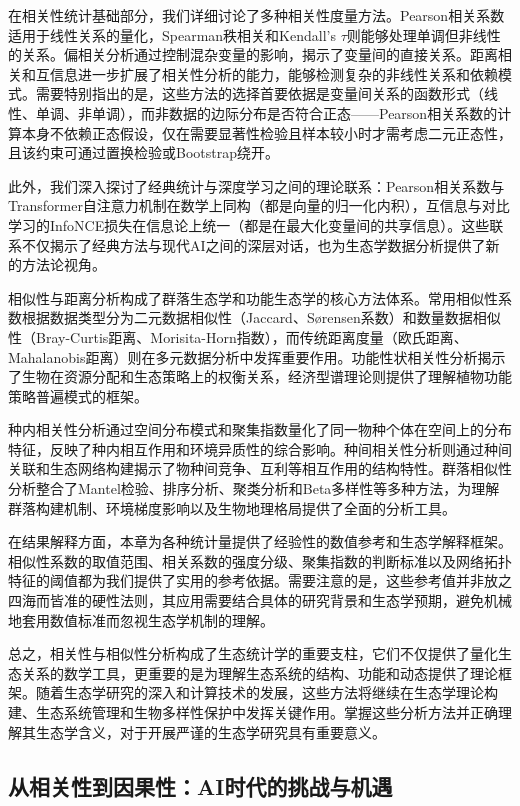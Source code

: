 \documentclass[
  twoside,12pt,fontset=none]{ctexbook}
\begin{document}
在相关性统计基础部分，我们详细讨论了多种相关性度量方法。Pearson相关系数适用于线性关系的量化，Spearman秩相关和Kendall's \(\tau\)则能够处理单调但非线性的关系。偏相关分析通过控制混杂变量的影响，揭示了变量间的直接关系。距离相关和互信息进一步扩展了相关性分析的能力，能够检测复杂的非线性关系和依赖模式。需要特别指出的是，这些方法的选择首要依据是变量间关系的函数形式（线性、单调、非单调），而非数据的边际分布是否符合正态------Pearson相关系数的计算本身不依赖正态假设，仅在需要显著性检验且样本较小时才需考虑二元正态性，且该约束可通过置换检验或Bootstrap绕开。

此外，我们深入探讨了经典统计与深度学习之间的理论联系：Pearson相关系数与Transformer自注意力机制在数学上同构（都是向量的归一化内积），互信息与对比学习的InfoNCE损失在信息论上统一（都是在最大化变量间的共享信息）。这些联系不仅揭示了经典方法与现代AI之间的深层对话，也为生态学数据分析提供了新的方法论视角。

相似性与距离分析构成了群落生态学和功能生态学的核心方法体系。常用相似性系数根据数据类型分为二元数据相似性（Jaccard、Sørensen系数）和数量数据相似性（Bray-Curtis距离、Morisita-Horn指数），而传统距离度量（欧氏距离、Mahalanobis距离）则在多元数据分析中发挥重要作用。功能性状相关性分析揭示了生物在资源分配和生态策略上的权衡关系，经济型谱理论则提供了理解植物功能策略普遍模式的框架。

种内相关性分析通过空间分布模式和聚集指数量化了同一物种个体在空间上的分布特征，反映了种内相互作用和环境异质性的综合影响。种间相关性分析则通过种间关联和生态网络构建揭示了物种间竞争、互利等相互作用的结构特性。群落相似性分析整合了Mantel检验、排序分析、聚类分析和Beta多样性等多种方法，为理解群落构建机制、环境梯度影响以及生物地理格局提供了全面的分析工具。

在结果解释方面，本章为各种统计量提供了经验性的数值参考和生态学解释框架。相似性系数的取值范围、相关系数的强度分级、聚集指数的判断标准以及网络拓扑特征的阈值都为我们提供了实用的参考依据。需要注意的是，这些参考值并非放之四海而皆准的硬性法则，其应用需要结合具体的研究背景和生态学预期，避免机械地套用数值标准而忽视生态学机制的理解。

总之，相关性与相似性分析构成了生态统计学的重要支柱，它们不仅提供了量化生态关系的数学工具，更重要的是为理解生态系统的结构、功能和动态提供了理论框架。随着生态学研究的深入和计算技术的发展，这些方法将继续在生态学理论构建、生态系统管理和生物多样性保护中发挥关键作用。掌握这些分析方法并正确理解其生态学含义，对于开展严谨的生态学研究具有重要意义。

\hypertarget{ux4eceux76f8ux5173ux6027ux5230ux56e0ux679cux6027aiux65f6ux4ee3ux7684ux6311ux6218ux4e0eux673aux9047}{%
\subsection{从相关性到因果性：AI时代的挑战与机遇}\label{ux4eceux76f8ux5173ux6027ux5230ux56e0ux679cux6027aiux65f6ux4ee3ux7684ux6311ux6218ux4e0eux673aux9047}}
\end{document}
